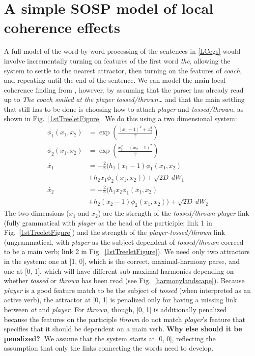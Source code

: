 \documentclass[10pt,letterpaper]{article}
\begin{document}
\section{A simple SOSP model of local coherence effects}
A full model of the word-by-word processing of the sentences in \ref{LCegs} would involve incrementally turning on features of the first word \emph{the}, allowing the system to settle to the nearest attractor, then turning on the features of \emph{coach}, and repeating until the end of the sentence. We can model the main local coherence finding from , however, by assuming that the parser has already read up to \emph{The coach smiled at the player tossed/thrown\dots} and that the main settling that still has to be done is choosing how to attach \emph{player} and \emph{tossed/thrown}, as shown in Fig.~\ref{1stTreeletFigure}. We do this using a two dimensional system:
\begin{equation}
\begin{aligned}\label{2dlc}
\phi_1(x_1, x_2) &= \exp\left(\tfrac{(x_1 - 1)^2 + x_2^2}{\gamma}\right)\\
\phi_2(x_1, x_2) &= \exp\left(\tfrac{x_1^2 + (x_2 - 1)^2}{\gamma}\right)\\
\dot{x_1} &= -\tfrac{2}{\gamma}(h_1 (x_1 - 1) \phi_1(x_1, x_2) \\ &+ h_2 x_1 \phi_2(x_1, x_2)) + \sqrt{2D}~dW_1\\
\dot{x_2} &= -\tfrac{2}{\gamma}(h_1 x_2 \phi_1(x_1, x_2) \\ &+ h_2 (x_2 - 1) \phi_2(x_1, x_2)) + \sqrt{2D}~dW_2
\end{aligned}
\end{equation}
The two dimensions ($x_1$ and $x_2$) are the strength of the \emph{tossed/thrown-player} link (fully grammatical with \emph{player} as the head of the participle; link 1 in Fig.~\ref{1stTreeletFigure}) and the strength of the \emph{player-tossed/thrown} link (ungrammatical, with \emph{player} as the subject dependent of \emph{tossed/thrown} coerced to be a main verb; link 2 in Fig.~\ref{1stTreeletFigure}). We need only two attractors in the system: one at [1, 0], which is the correct, maximal-harmony parse, and one at [0, 1], which will have different sub-maximal harmonies depending on whether \emph{tossed} or \emph{thrown} has been read (see Fig.~\ref{harmonylandscape}). Because \emph{player} is a good feature match to be the subject of \emph{tossed} (when interpreted as an active verb), the attractor at [0, 1] is penalized only for having a missing link between \emph{at} and \emph{player}. For \emph{thrown}, though, [0, 1] is additionally penalized because the features on the participle \emph{thrown} do not match \emph{player}'s feature that specifies that it should be dependent on a main verb. \textbf{Why else should it be penalized?}. We assume that the system starts at [0, 0], reflecting the assumption that only the links connecting the words need to develop. %
\end{document}
